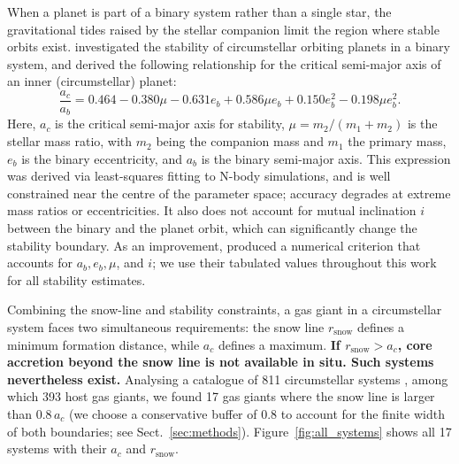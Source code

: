 \documentclass{aa}
\newcommand{\rev}[1]{{\color{red}\textbf{#1}}}
\begin{document}
When a planet is part of a binary system rather than a single star, the
gravitational tides raised by the stellar companion limit the region
where stable orbits exist. \citet{Holman1999} investigated the stability
of circumstellar orbiting planets in a binary system, and derived the
following relationship for the critical semi-major axis of an inner
(circumstellar) planet:
\begin{equation} \label{eq:stability}
  \frac{a_c}{a_b} = 0.464 - 0.380\mu - 0.631 e_b + 0.586\mu e_b
                    + 0.150 e_b^2 - 0.198 \mu e_b^2.
\end{equation}
Here, $a_c$ is the critical semi-major axis for stability,
$\mu = m_2/(m_1 + m_2)$ is the stellar mass ratio, with $m_2$ being the
companion mass and $m_1$ the primary mass, $e_b$ is the binary
eccentricity, and $a_b$ is the binary semi-major axis. This expression
was derived via least-squares fitting to N-body simulations, and is well
constrained near the centre of the parameter space; accuracy degrades at
extreme mass ratios or eccentricities. It also does not account for
mutual inclination $i$ between the binary and the planet orbit, which
can significantly change the stability boundary. As an improvement,
\citet{Quarles_2020} produced a numerical criterion that accounts for
$a_b, e_b, \mu$, and $i$; we use their tabulated values throughout this
work for all stability estimates.

Combining the snow-line and stability constraints, a gas giant in a
circumstellar system faces two simultaneous requirements: the snow line
$r_\mathrm{snow}$ defines a minimum formation distance, while $a_c$
defines a maximum. \rev{If $r_\mathrm{snow} > a_c$, core accretion
beyond the snow line is not available in situ. Such systems nevertheless
exist.} Analysing a catalogue of 811
circumstellar systems \citep{Thebault2025}, among which 393 host gas
giants, we found 17 gas giants where the snow line is larger than
$0.8\,a_c$ (we choose a conservative buffer of 0.8 to account for the
finite width of both boundaries; see Sect.~\ref{sec:methods}).
Figure~\ref{fig:all_systems} shows all 17 systems with their $a_c$ and
$r_\mathrm{snow}$.
\end{document}
